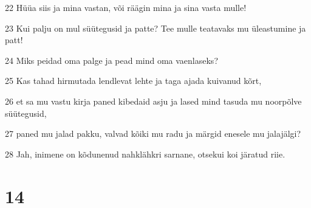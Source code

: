 \par 22 Hüüa siis ja mina vastan, või räägin mina ja sina vasta mulle!
\par 23 Kui palju on mul süütegusid ja patte? Tee mulle teatavaks mu üleastumine ja patt!
\par 24 Miks peidad oma palge ja pead mind oma vaenlaseks?
\par 25 Kas tahad hirmutada lendlevat lehte ja taga ajada kuivanud kõrt,
\par 26 et sa mu vastu kirja paned kibedaid asju ja lased mind tasuda mu noorpõlve süütegusid,
\par 27 paned mu jalad pakku, valvad kõiki mu radu ja märgid enesele mu jalajälgi?
\par 28 Jah, inimene on kõdunenud nahklähkri sarnane, otsekui koi järatud riie.

\chapter{14}

